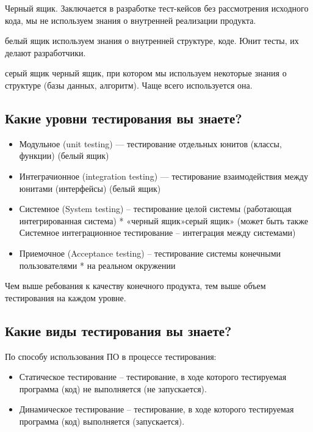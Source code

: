 Черный ящик. Заключается в разработке тест-кейсов без
рассмотрения исходного кода, мы не используем знания о внутренней реализации
продукта.

белый ящик используем знания о внутренней структуре, коде. Юнит тесты, их
делают разработчики.

серый ящик черный ящик, при котором мы используем некоторые знания о структуре
(базы данных, алгоритм). Чаще всего используется она.

\subsection{Какие уровни тестирования вы знаете?}

\begin{itemize}
    \item Модульное (unit testing) --- тестирование отдельных юнитов (классы,
        функции) (белый ящик)

    \item Интеграчионное (integration testing) --- тестирование взаимодействия
        между юнитами (интерфейсы) (белый ящик)

    \item Системное (System testing) – тестирование целой системы
        (работающая интегрированная система) * «черный ящик»\»серый ящик»
        (может быть также Системное интеграционное тестирование –
        интеграция между системами)

    \item Приемочное (Acceptance testing) – тестирование системы
        конечными пользователями * на реальном окружении
\end{itemize}

Чем выше ребования к качеству конечного продукта, тем выше объем тестирования
на каждом уровне.

\subsection{Какие виды тестирования вы знаете?}

По способу использования ПО в процессе тестирования:

\begin{itemize}
    \item Статическое тестирование – тестирование, в ходе которого тестируемая программа
        (код) не выполняется (не запускается).

    \item Динамическое тестирование – тестирование, в ходе которого тестируемая программа
        (код) выполняется (запускается).
\end{itemize}

